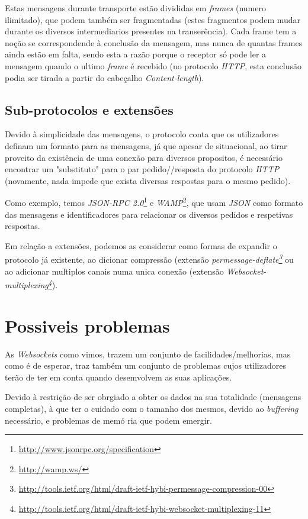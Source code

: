 \documentclass[a4paper]{article}
\begin{document}
Estas mensagens durante transporte estão divididas em \emph{frames} (numero ilimitado), que podem também ser fragmentadas (estes fragmentos podem mudar durante os diversos intermediarios presentes na transerência). Cada frame tem a noção se correspondende à conclusão da mensagem, mas nunca de quantas frames ainda estão em falta, sendo esta a razão porque o receptor só pode ler a mensagem quando o ultimo \emph{frame} é recebido (no protocolo \emph{HTTP}, esta conclusão podia ser tirada a partir do cabeçalho \emph{Content-length}). 

\subsection{Sub-protocolos e extensões}

Devido à simplicidade das mensagens, o protocolo conta que os utilizadores definam um formato para as mensagens, já que apesar de situacional, ao tirar proveito da existência de uma conexão para diversos propositos, é necessário encontrar um "substituto" para o par pedido//resposta do protocolo \emph{HTTP} (novamente, nada impede que exista diversas respostas para o mesmo pedido). 

Como exemplo, temos \emph{JSON-RPC 2.0}\footnote{\url{http://www.jsonrpc.org/specification}} e \emph{WAMP}\footnote{\url{http://wamp.ws/}}, que usam \emph{JSON} como formato das mensagens e identificadores para relacionar os diversos pedidos e respetivas respostas.

\medskip

Em relação a extensões, podemos as considerar como formas de expandir o protocolo já existente, ao dicionar compressão (extensão \emph{permessage-deflate\footnote{\url{http://tools.ietf.org/html/draft-ietf-hybi-permessage-compression-00}}} ou ao adicionar multiplos canais numa unica conexão (extensão \emph{Websocket-multiplexing\footnote{\url{http://tools.ietf.org/html/draft-ietf-hybi-websocket-multiplexing-11}}}). 

\section{Possiveis problemas}

As \emph{Websockets} como vimos, trazem um conjunto de facilidades/melhorias, mas como é de esperar, traz também um conjunto de problemas cujos utilizadores terão de ter em conta quando desemvolvem as suas aplicações.

Devido à restrição de ser obrgiado a obter os dados na sua totalidade (mensagens completas), à que ter o cuidado com o tamanho dos mesmos, devido ao \emph{buffering} necessário, e problemas de memó ria que podem emergir.
\end{document}
